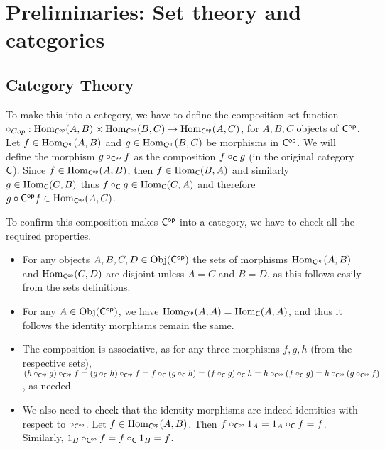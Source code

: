 \section{Preliminaries: Set theory and categories}
\setcounter{subsection}{2}

\subsection{Category Theory}

\begin{problem}
\end{problem}

\begin{solution}
	To make this into a category, we have to define the composition set-function $\circ_{Cop} : \mathrm{Hom}_{\mathsf{C^{op}}}(A,B) \times \mathrm{Hom}_{\mathsf{C^{op}}}(B,C) \to \mathrm{Hom}_{\mathsf{C^{op}}}(A,C)$, for $A,B,C$ objects of $\mathsf{C^{op}}$. Let $f \in \mathrm{Hom}_{\mathsf{C^{op}}}(A,B)$ and $g \in \mathrm{Hom}_{\mathsf{C^{op}}}(B,C)$ be morphisms in $\mathsf{C^{op}}$. We will define the morphism $g \circ_{\mathsf{C^{op}}} f$ as the composition $f \circ_{\mathsf{C}} g$ (in the original category $\mathsf{C}$). Since $f \in \mathrm{Hom}_{\mathsf{C^{op}}}(A,B)$, then $f \in \mathrm{Hom}_{\mathsf{C}}(B,A)$ and similarly $g \in \mathrm{Hom}_{\mathsf{C}}(C,B)$ thus $f \circ_{\mathsf{C}} g \in \mathrm{Hom}_{\mathsf{C}}(C,A)$ and therefore $g \circ{\mathsf{C^{op}}} f \in \mathrm{Hom}_{\mathsf{C^{op}}}(A,C)$.
	
	To confirm this composition makes $\mathsf{C^{op}}$ into a category, we have to check all the required properties.
	\begin{itemize}
		\item For any objects $A, B, C, D \in \mathrm{Obj}(\mathsf{C^{op}})$ the sets of morphisms $\mathrm{Hom}_{\mathsf{C^{op}}}(A,B)$ and $\mathrm{Hom}_{\mathsf{C^{op}}}(C,D)$ are disjoint unless $A=C$ and $B=D$, as this follows easily from the sets definitions.
		\item For any $A \in \mathrm{Obj}(\mathsf{C^{op}})$, we have $\mathrm{Hom}_{\mathsf{C^{op}}}(A,A) = \mathrm{Hom}_{\mathsf{C}}(A,A)$, and thus it follows the identity morphisms remain the same.
		\item The composition is associative, as for any three morphisms $f,g,h$ (from the respective sets), $(h \circ_{\mathsf{C^{op}}} g) \circ_{\mathsf{C^{op}}} f = (g \circ_{\mathsf{C}} h) \circ_{\mathsf{C^{op}}} f = f \circ_{\mathsf{C}} (g \circ_{\mathsf{C}} h) = (f \circ_{\mathsf{C}} g) \circ_{\mathsf{C}} h = h \circ_{\mathsf{C^{op}}} (f \circ_{\mathsf{C}} g) = h \circ_{\mathsf{C^{op}}} (g \circ_{\mathsf{C^{op}}} f)$, as needed.
		\item We also need to check that the identity morphisms are indeed identities with respect to $\circ_{\mathsf{C^{op}}}$. Let $f \in \mathrm{Hom}_{\mathsf{C^{op}}}(A,B)$. Then $f \circ_{\mathsf{C^{op}}} 1_A = 1_A \circ_{\mathsf{C}} f = f$. Similarly, $1_B \circ_{\mathsf{C^{op}}} f = f \circ_{\mathsf{C}} 1_B = f$. \qedhere
	\end{itemize}
\end{solution}

